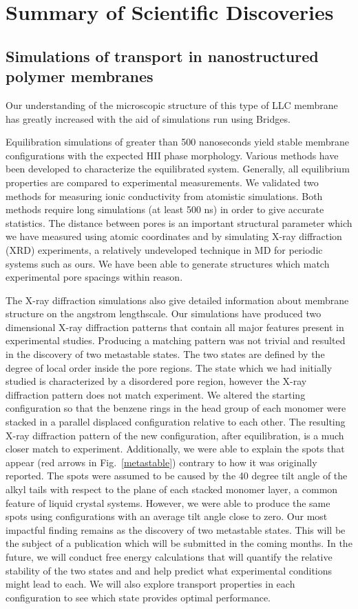 \section*{Summary of Scientific Discoveries}

\subsection*{Simulations of transport in nanostructured polymer membranes}
Our understanding of the microscopic structure of this type of LLC
membrane has greatly increased with the aid of simulations run using
Bridges. 

Equilibration simulations of greater than 500 nanoseconds yield
stable membrane configurations with the expected HII phase 
morphology. Various methods have been developed to characterize
the equilibrated system. Generally, all equilibrium properties are
compared to experimental measurements. We validated two methods
for measuring ionic conductivity from atomistic simulations. Both 
methods require long simulations (at least 500 ns) in order to give
accurate statistics. The distance between pores is an important
structural parameter which we have measured using atomic coordinates
and by simulating X-ray diffraction (XRD) experiments, a relatively
undeveloped technique in MD for periodic systems such as ours. We 
have been able to generate structures which match experimental pore
spacings within reason.

The X-ray diffraction simulations also give detailed information
about membrane structure on the angstrom lengthscale. Our simulations
have produced two dimensional X-ray diffraction patterns that 
contain all major features present in experimental studies. Producing
a matching pattern was not trivial and resulted in the discovery of
two metastable states. The two states are defined by the degree of 
local order inside the pore regions. The state which we had initially
studied is characterized by a disordered pore region, however the X-ray
diffraction pattern does not match experiment. We altered the starting 
configuration so that the benzene rings in the head group of each
monomer were stacked in a parallel displaced configuration relative
to each other. The resulting X-ray diffraction pattern of the new
configuration, after equilibration, is a much closer match to experiment.
Additionally, we were able to explain the spots that appear (red arrows
in Fig.~\ref{metastable}) contrary to how it was originally reported. The spots 
were assumed to be caused by the 40 degree tilt angle of the alkyl
tails with respect to the plane of each stacked monomer layer, a 
common feature of liquid crystal systems. However, we were able to 
produce the same spots using configurations with an average tilt angle
close to zero. Our most impactful finding remains as the discovery of 
two metastable states. This will be the subject of a publication which 
will be submitted in the coming months. In the future, we will conduct
free energy calculations that will quantify the relative stability of
the two states and and help predict what experimental conditions might
lead to each. We will also explore transport properties in each 
configuration to see which state provides optimal performance. 

